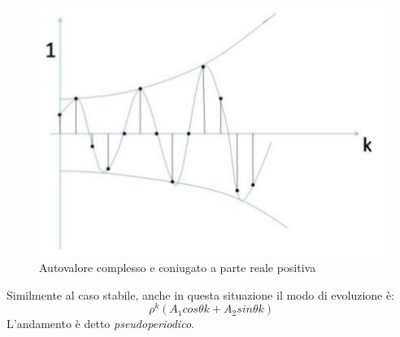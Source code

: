 \documentclass[a4paper]{report}
\begin{document}
\begin{figure}[!h]
  \begin{center}
    \includegraphics[scale=0.3]{./figures/autovaloreComplessoConiugatoRealePositivoInstabile01.png}
    \caption{Autovalore complesso e coniugato a parte reale
      positiva}\label{fig:autovaloreComplessoConiugatoRealePositivoInstabile01.png} 
  \end{center}
\end{figure}
Similmente al caso stabile, anche in questa situazione il modo di
evoluzione \`e:
\[
\rho^k (A_1 cos \theta k + A_2 sin \theta k)
\]
L'andamento \`e detto {\em pseudoperiodico}.
\end{document}

